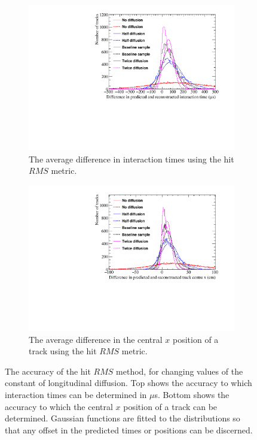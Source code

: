 \begin{figure}[h!]
  \centering
  \begin{subfigure}{0.6\textwidth}
    \centering
    \includegraphics[width=\textwidth]{Canvas_AvDiff_T_RMS_Diffusion}
    \caption{The average difference in interaction times using the hit $RMS$ metric.}
    \label{fig:DiffLDiff_AvDiffRMS_T}
  \end{subfigure}
  \begin{subfigure}{0.6\textwidth}
    \centering
    \includegraphics[width=\textwidth]{Canvas_AvDiff_X_RMS_Diffusion}
    \caption{The average difference in the central $x$ position of a track using the hit $RMS$ metric.}
    \label{fig:DiffLDiff_AvDiffRMS_X}
  \end{subfigure}
  \caption[Comparing the accuracy of the hit $RMS$ method, as the constant of longitudinal diffusion changes]
          {The accuracy of the hit $RMS$ method, for changing values of the constant of longitudinal diffusion. Top shows the accuracy to which interaction times can be determined in $\mu$s. Bottom shows the accuracy to which the central $x$ position of a track can be determined. Gaussian functions are fitted to the distributions so that any offset in the predicted times or positions can be discerned.}
  \label{fig:DiffLDiff_AvDiff_RMS}
\end{figure}

